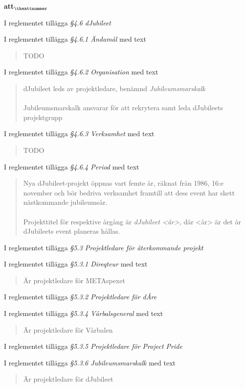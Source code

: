 \documentclass[a4paper]{article}
\begin{document}
\begin{list}{\bf att$_{\theattnummer}$}{}

\item I reglementet tillägga \textit{\S4.6 dJubileet}
\item I reglementet tillägga \textit{\S4.6.1 Ändamål} med text \begin{quote} TODO \end{quote}
\item I reglementet tillägga \textit{\S4.6.2 Organisation} med text \begin{quote} dJubileet leds av projektledare, benämnd \textit{Jubileumsmarskalk}\\\\Jubileumsmarskalk ansvarar för att rekrytera samt leda dJubileets projektgrupp\end{quote}
\item I reglementet tillägga \textit{\S4.6.3 Verksamhet} med text \begin{quote} TODO \end{quote}
\item I reglementet tillägga \textit{\S4.6.4 Period} med text \begin{quote} Nya dJubileet-projekt öppnas vart femte år, räknat från 1986, 16:e november och bör bedriva verksamhet framtill att dess event har skett nästkommande jubileumsår.\\\\Projekttitel för respektive årgång är \textit{dJubileet <år>}, där <år> är det år dJubileets event planeras hållas.\end{quote}


\item I reglementet tillägga \textit{\S5.3 Projektledare för återkommande projekt}
\item I reglementet tillägga \textit{\S5.3.1 Direqteur} med text \begin{quote} Är projektledare för METAspexet \end{quote}
\item I reglementet tillägga \textit{\S5.3.2 Projektledare för dÅre}
\item I reglementet tillägga \textit{\S5.3.4 Vårbalsgeneral} med text \begin{quote} Är projektledare för Vårbalen \end{quote}
\item I reglementet tillägga \textit{\S5.3.5 Projektledare för Project Pride}
\item I reglementet tillägga \textit{\S5.3.6 Jubileumsmarskalk} med text \begin{quote} Är projektledare för dJubileet \end{quote}


\end{list}
\end{document}
